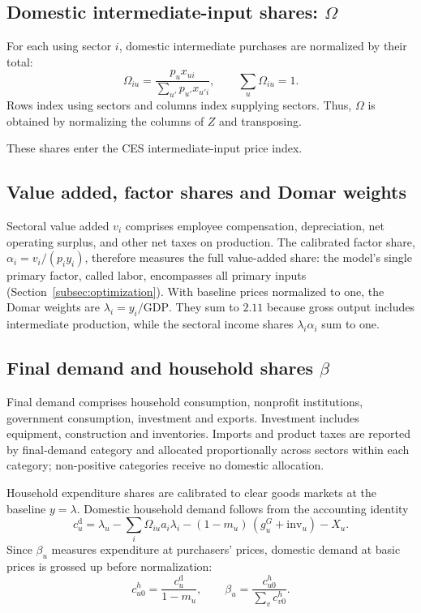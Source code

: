 \subsection{Domestic intermediate-input shares: $\Omega$}\label{app:pipeline-omega}

For each using sector $i$, domestic intermediate purchases are normalized by their total:
\[
\Omega_{iu}
= \frac{p_u x_{ui}}{\sum_{u'} p_{u'}x_{u'i}},
\qquad
\sum_u \Omega_{iu}=1.
\]
Rows index using sectors and columns index supplying sectors. Thus, $\Omega$ is obtained by normalizing the columns of $Z$ and transposing.

These shares enter the CES intermediate-input price index.

\subsection{Value added, factor shares and Domar weights}\label{app:pipeline-va}

Sectoral value added $v_i$ comprises employee compensation, depreciation, net operating surplus, and other net taxes on production. The calibrated factor share, $\alpha_i=v_i/(p_i y_i)$, therefore measures the full value-added share: the model's single primary factor, called labor, encompasses all primary inputs (Section~\ref{subsec:optimization}). With baseline prices normalized to one, the Domar weights are $\lambda_i=y_i/\mathrm{GDP}$. They sum to $2.11$ because gross output includes intermediate production, while the sectoral income shares $\lambda_i\alpha_i$ sum to one.

\subsection{Final demand and household shares $\beta$}\label{app:pipeline-fd}

Final demand comprises household consumption, nonprofit institutions, government consumption, investment and exports. Investment includes equipment, construction and inventories. Imports and product taxes are reported by final-demand category and allocated proportionally across sectors within each category; non-positive categories receive no domestic allocation.

Household expenditure shares are calibrated to clear goods markets at the baseline $y=\lambda$. Domestic household demand follows from the accounting identity
\begin{equation}
c^{\mathrm{d}}_u = \lambda_u - \sum_i \Omega_{iu} a_i\lambda_i
  - (1-m_u)\,(g^G_u + \mathrm{inv}_u) - X_u .
\label{eq:betaresid}
\end{equation}
Since $\beta_u$ measures expenditure at purchasers' prices, domestic demand at basic prices is grossed up before normalization:
\begin{equation}
c^{h}_{u0} = \frac{c^{\mathrm{d}}_u}{1-m_u}, \qquad \beta_u = \frac{c^{h}_{u0}} {\sum_v c^{h}_{v0}}.
\end{equation}

